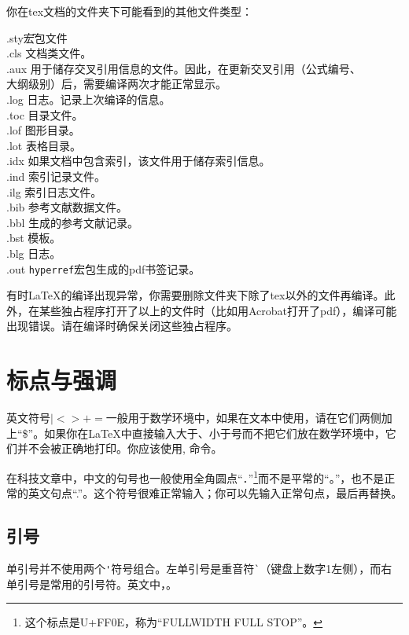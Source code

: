 你在tex文档的文件夹下可能看到的其他文件类型：
\begin{tabbing}
	.sty{\hspace{2em}}\=宏包文件\\
	.cls	\> 文档类文件。\\
	.aux    \> 用于储存交叉引用信息的文件。因此，在更新交叉引用（公式编号、\\
	\> 大纲级别）后，需要编译两次才能正常显示。\\
	.log    \> 日志。记录上次编译的信息。\\
	.toc    \> 目录文件。\\
	.lof    \> 图形目录。\\
	.lot    \> 表格目录。\\
	.idx    \> 如果文档中包含索引，该文件用于储存索引信息。\\
	.ind	\> 索引记录文件。\\
	.ilg	\> 索引日志文件。\\
	.bib	\> \bibtex 参考文献数据文件。\\
	.bbl	\> \bibtex 生成的参考文献记录。\\
	.bst	\> \bibtex 模板。\\
	.blg	\> \bibtex 日志。\\
	.out	\> \texttt{hyperref}宏包生成的pdf书签记录。
\end{tabbing}

有时\LaTeX 的编译出现异常，你需要删除文件夹下除了tex以外的文件再编译。此外，在某些独占程序打开了以上的文件时（比如用Acrobat打开了pdf），编译可能出现错误。请在编译时确保关闭这些独占程序。

\section{标点与强调}
英文符号$|<>+=$一般用于数学环境中，如果在文本中使用，请在它们两侧加上“\$”。如果你在\LaTeX 中直接输入大于、小于号而不把它们放在数学环境中，它们并不会被正确地打印。你应该使用, 命令。

在科技文章中，中文的句号也一般使用全角圆点“．”\footnote{这个标点是U+FF0E，称为“FULLWIDTH FULL STOP”。}而不是平常的“。”，也不是正常的英文句点“.”。这个符号很难正常输入；你可以先输入正常句点，最后再替换。

\subsection{引号}
单引号并不使用两个\verb|'|符号组合。左单引号是重音符\verb|`|（键盘上数字1左侧），而右单引号是常用的引号符。英文中，。

